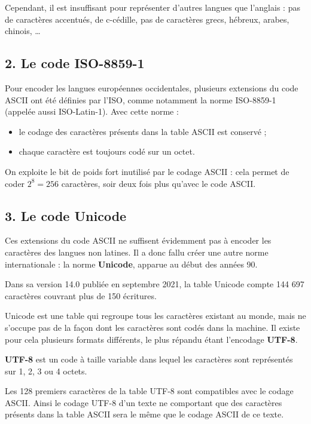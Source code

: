 \documentclass[11pt,a4paper]{article}
\providecommand{\tightlist}{\setlength{\itemsep}{0pt}\setlength{\parskip}{0pt}}
\begin{document}
Cependant, il est insuffisant pour représenter d'autres langues que
l'anglais : pas de caractères accentués, de c-cédille, pas de caractères
grecs, hébreux, arabes, chinois, \ldots{}

\hypertarget{le-code-iso-8859-1}{%
\subsection*{2. Le code ISO-8859-1}\label{le-code-iso-8859-1}}

Pour encoder les langues européennes occidentales, plusieurs extensions
du code ASCII ont été définies par l'ISO, comme notamment la norme
ISO-8859-1 (appelée aussi ISO-Latin-1). Avec cette norme :

\begin{itemize}
\tightlist
\item
  le codage des caractères présents dans la table ASCII est conservé ;
\item
  chaque caractère est toujours codé sur un octet.
\end{itemize}

On exploite le bit de poids fort inutilisé par le codage ASCII : cela
permet de coder \(2^8=256\) caractères, soir deux fois plus qu'avec le
code ASCII.

\hypertarget{le-code-unicode}{%
\subsection*{3. Le code Unicode}\label{le-code-unicode}}

Ces extensions du code ASCII ne suffisent évidemment pas à encoder les
caractères des langues non latines. Il a donc fallu créer une autre
norme internationale : la norme \textbf{Unicode}, apparue au début des
années 90.

Dans sa version 14.0 publiée en septembre 2021, la table Unicode compte
144 697 caractères couvrant plus de 150 écritures.

Unicode est une table qui regroupe tous les caractères existant au monde,
mais ne s'occupe pas de la façon dont les caractères sont codés dans la
machine. Il existe pour cela plusieurs formats différents, le plus
répandu étant l'encodage \textbf{UTF-8}.

\textbf{UTF-8} est un code à taille variable dans lequel les caractères
sont représentés sur 1, 2, 3 ou 4 octets.

Les 128 premiers caractères de la table UTF-8 sont compatibles avec le
codage ASCII. Ainsi le codage UTF-8 d'un texte ne comportant que des
caractères présents dans la table ASCII sera le même que le codage ASCII
de ce texte.
\end{document}
